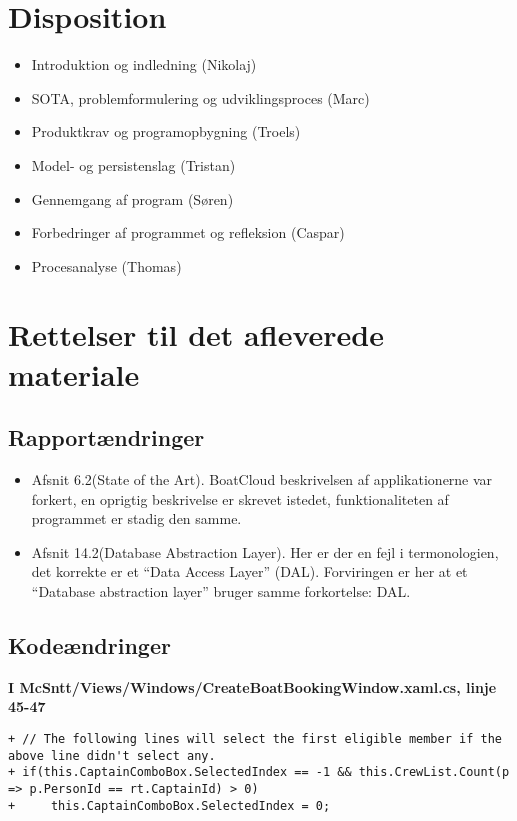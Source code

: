\documentclass[article,a4paper,11pt,onseside,final]{memoir}
\begin{document}
\chapter{Disposition}

	\begin{itemize}
	\item Introduktion og indledning (Nikolaj)
	\item SOTA, problemformulering og udviklingsproces (Marc)
	\item Produktkrav og programopbygning (Troels)
	\item Model- og persistenslag (Tristan)
	\item Gennemgang af program (Søren)
	\item Forbedringer af programmet og refleksion (Caspar)
	\item Procesanalyse	(Thomas)
	\end{itemize}

\newpage
\chapter{Rettelser til det afleverede materiale}

\section{Rapportændringer}
\begin{itemize}
    \item Afsnit 6.2(State of the Art). BoatCloud beskrivelsen af applikationerne var forkert, en oprigtig beskrivelse er skrevet istedet, funktionaliteten af programmet er stadig den samme.
    \item Afsnit 14.2(Database Abstraction Layer). Her er der en fejl i termonologien, det korrekte er et ``Data Access Layer'' (DAL). Forviringen er her at et ``Database abstraction layer'' bruger samme forkortelse: DAL. 
\end{itemize}

\section{Kodeændringer}

\textbf{I McSntt/Views/Windows/CreateBoatBookingWindow.xaml.cs, linje 45-47}
\lstset{firstnumber=45}
\begin{lstlisting}[frame=single, caption=CreateBoatBookingWindow.cs ændringer, label=fntpg-cb]
+ // The following lines will select the first eligible member if the above line didn't select any.
+ if(this.CaptainComboBox.SelectedIndex == -1 && this.CrewList.Count(p => p.PersonId == rt.CaptainId) > 0) 
+     this.CaptainComboBox.SelectedIndex = 0;
\end{lstlisting}
\end{document}

